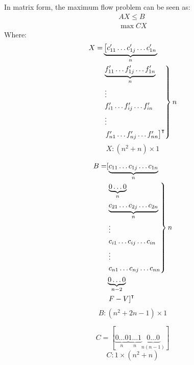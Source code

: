 In matrix form, the maximum flow problem can be seen as:
\begin{equation*}
\begin{gathered}
  AX \leq B \\
  \max{CX}
\end{gathered}
\end{equation*}
Where:
\begin{align*}
  X = &\underbrace{\left[c'_{11} \dots c'_{1j} \dots c'_{1n} \right.}_{n} \\
    &\begin{rcases}
      \underbrace{f'_{11} \dots f'_{1j} \dots f'_{1n}}_{n} \\
      \vdots \\
      f'_{i1} \dots f'_{ij} \dots f'_{in} \\
      \vdots \\
      \left. f'_{n1} \dots f'_{nj} \dots f'_{nn} \right]^\intercal
    \end{rcases} n
\end{align*}
\begin{equation*}
  X : \left(n^2 + n\right) \times 1
\end{equation*}

\begin{align*}
  B = &[\underbrace{c_{11} \dots c_{1j} \dots c_{1n}}_{n} \\
    &\begin{rcases}
      \underbrace{0 \dots 0}_{n} \\
      \underbrace{c_{21} \dots c_{2j} \dots c_{2n}}_{n} \\
      \vdots \\
      c_{i1} \dots c_{ij} \dots c_{in} \\
      \vdots \\
      c_{n1} \dots c_{nj} \dots c_{nn}
    \end{rcases} n \\
    &\underbrace{0 \dots 0}_{n-2} \\
    &\left. F - V \right]^\intercal
\end{align*}
\begin{equation*}
  B : \left(n^2 + 2n - 1\right) \times 1
\end{equation*}

\begin{equation*}
  C = [\underbrace{0 \dots 0}_{n}
      \underbrace{1 \dots 1}_{n}
      \underbrace{0 \dots 0}_{n\left(n - 1\right)}]
\end{equation*}
\begin{equation*}
  C : 1 \times \left(n^2 + n\right)
\end{equation*}

